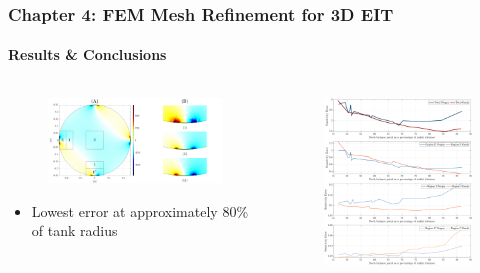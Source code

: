\documentclass[10pt,    %
    english,            %
    xcolor=table,       %
    envcountsect,        %
    aspectratio=1610
]{beamer}
\begin{document}
\begin{frame}
	\frametitle{Chapter 4: FEM Mesh Refinement for 3D EIT}
	\framesubtitle{Results \& Conclusions}
	\begin{columns}[c]
		\begin{column}{0.47\textwidth}
	\begin{figure}
		\centering
	\includegraphics[width=\textwidth,trim={0 0 15cm 1.2cm},clip]{roi_methods_figure.pdf}
	\end{figure}
	\begin{itemize}
		\item Lowest error at approximately 80\% of tank radius
	\end{itemize}
\end{column}
\begin{column}{0.53\textwidth}
	\begin{figure}
		\centering
		\vspace{-5mm}
	\includegraphics[width=\textwidth,trim={0 0 0cm 0cm},clip]{m-mesh_sens_error_regions_split.pdf}
	\end{figure}
\end{column}
\end{columns}

\end{frame}
\end{document}

